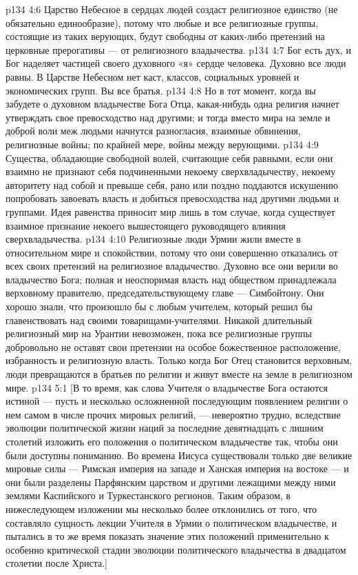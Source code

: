 \vs p134 4:6 Царство Небесное в сердцах людей создаст религиозное единство (не обязательно единообразие), потому что любые и все религиозные группы, состоящие из таких верующих, будут свободны от каких\hyp{}либо претензий на церковные прерогативы --- от религиозного владычества.
\vs p134 4:7 Бог есть дух, и Бог наделяет частицей своего духовного «я» сердце человека. Духовно все люди равны. В Царстве Небесном нет каст, классов, социальных уровней и экономических групп. Вы все братья.
\vs p134 4:8 Но в тот момент, когда вы забудете о духовном владычестве Бога Отца, какая\hyp{}нибудь одна религия начнет утверждать свое превосходство над другими; и тогда вместо мира на земле и доброй воли меж людьми начнутся разногласия, взаимные обвинения, религиозные войны; по крайней мере, войны между верующими.
\vs p134 4:9 Существа, обладающие свободной волей, считающие себя равными, если они взаимно не признают себя подчиненными некоему сверхвладычеству, некоему авторитету над собой и превыше себя, рано или поздно поддаются искушению попробовать завоевать власть и добиться превосходства над другими людьми и группами. Идея равенства приносит мир лишь в том случае, когда существует взаимное признание некоего вышестоящего руководящего влияния сверхвладычества.
\vs p134 4:10 Религиозные люди Урмии жили вместе в относительном мире и спокойствии, потому что они совершенно отказались от всех своих претензий на религиозное владычество. Духовно все они верили во владычество Бога; полная и неоспоримая власть над обществом принадлежала верховному правителю, председательствующему главе --- Симбойтону. Они хорошо знали, что произошло бы с любым учителем, который решил бы главенствовать над своими товарищами\hyp{}учителями. Никакой длительный религиозный мир на Урантии невозможен, пока все религиозные группы добровольно не оставят свои претензии на особое божественное расположение, избранность и религиозную власть. Только когда Бог Отец становится верховным, люди превращаются в братьев по религии и живут вместе на земле в религиозном мире.
\vs p134 5:1 [В то время, как слова Учителя о владычестве Бога остаются истиной --- пусть и несколько осложненной последующим появлением религии о нем самом в числе прочих мировых религий, --- невероятно трудно, вследствие эволюции политической жизни наций за последние девятнадцать с лишним столетий изложить его положения о политическом владычестве так, чтобы они были доступны пониманию. Во времена Иисуса существовали только две великие мировые силы --- Римская империя на западе и Ханская империя на востоке --- и они были разделены Парфянским царством и другими лежащими между ними землями Каспийского и Туркестанского регионов. Таким образом, в нижеследующем изложении мы несколько более отклонились от того, что составляло сущность лекции Учителя в Урмии о политическом владычестве, и пытались в то же время показать значение этих положений применительно к особенно критической стадии эволюции политического владычества в двадцатом столетии после Христа.]
